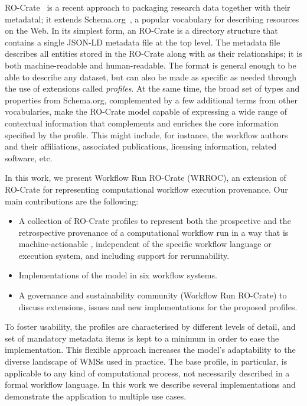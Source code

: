 RO-Crate~\cite{Soiland-Reyes 2022} is a recent approach to packaging research data together with their metadatal; it extends Schema.org~\cite{Guha 2015}, a popular vocabulary for describing resources on the Web.
In its simplest form, an RO-Crate is a directory structure that contains a single JSON-LD metadata file at the top level.
The metadata file describes all entities stored in the RO-Crate along with as their relationships; it is both machine-readable and human-readable.
The format is general enough to be able to describe any dataset, but can also be made as specific as needed through the use of extensions called
\emph{profiles}.
At the same time, the broad set of types and properties from Schema.org, complemented by a few additional terms from other vocabularies, make the RO-Crate model capable of expressing a wide range of contextual information that complements and enriches the core information specified by the profile.
This might include, for instance, the workflow authors and their affiliations, associated publications, licensing information, related software, etc.

In this work, we present Workflow Run RO-Crate (WRROC), an extension of RO-Crate for representing computational workflow execution provenance.
Our main contributions are the following:

\begin{itemize}
\item   A collection of RO-Crate profiles to represent both the prospective and the retrospective provenance of a computational   workflow run in a way that is machine-actionable \cite{Batista 2022},  independent of the specific  workflow language or   execution system, and including support for rerunnability.
\item   Implementations of the model in six workflow systems.
\item   A governance and sustainability community (Workflow Run RO-Crate) to discuss extensions,  issues and new implementations for the proposed   profiles.
\end{itemize}

To foster usability, the profiles are characterised by different levels of detail, and set of mandatory metadata items is kept to a minimum in order to ease the implementation.
This flexible approach increases the model's adaptability to the diverse landscape of WMSs used in practice.
The base profile, in particular, is applicable to any kind of computational process, not necessarily described in a formal workflow language.
In this work we describe several implementations and demonstrate the application to multiple use cases.

